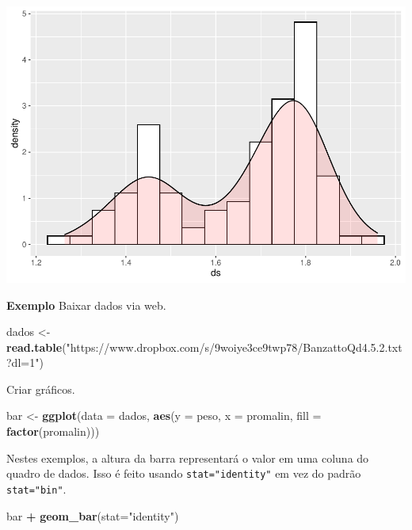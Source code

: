 \documentclass[
]{book}
\newenvironment{Shaded}{\begin{snugshade}}{\end{snugshade}}
\newcommand{\DataTypeTok}[1]{\textcolor[rgb]{0.13,0.29,0.53}{#1}}
\newcommand{\KeywordTok}[1]{\textcolor[rgb]{0.13,0.29,0.53}{\textbf{#1}}}
\newcommand{\NormalTok}[1]{#1}
\newcommand{\OperatorTok}[1]{\textcolor[rgb]{0.81,0.36,0.00}{\textbf{#1}}}
\newcommand{\StringTok}[1]{\textcolor[rgb]{0.31,0.60,0.02}{#1}}
\begin{document}
\includegraphics{TudodoR_files/figure-latex/unnamed-chunk-194-1.pdf}

\textbf{Exemplo}
Baixar dados via web.

\begin{Shaded}
\begin{Highlighting}[]
\NormalTok{dados <-}\StringTok{ }\KeywordTok{read.table}\NormalTok{(}\StringTok{"https://www.dropbox.com/s/9woiye3ce9twp78/BanzattoQd4.5.2.txt?dl=1"}\NormalTok{)}
\end{Highlighting}
\end{Shaded}

Criar gráficos.

\begin{Shaded}
\begin{Highlighting}[]
\NormalTok{bar <-}\StringTok{ }\KeywordTok{ggplot}\NormalTok{(}\DataTypeTok{data =}\NormalTok{ dados, }\KeywordTok{aes}\NormalTok{(}\DataTypeTok{y =}\NormalTok{ peso, }\DataTypeTok{x =}\NormalTok{ promalin, }\DataTypeTok{fill =} \KeywordTok{factor}\NormalTok{(promalin)))}
\end{Highlighting}
\end{Shaded}

Nestes exemplos, a altura da barra representará o valor em uma coluna do quadro de dados. Isso é feito usando \texttt{stat="identity"} em vez do padrão \texttt{stat="bin"}.

\begin{Shaded}
\begin{Highlighting}[]
\NormalTok{bar }\OperatorTok{+}\StringTok{  }\KeywordTok{geom_bar}\NormalTok{(}\DataTypeTok{stat=}\StringTok{"identity"}\NormalTok{)}
\end{Highlighting}
\end{Shaded}
\end{document}
